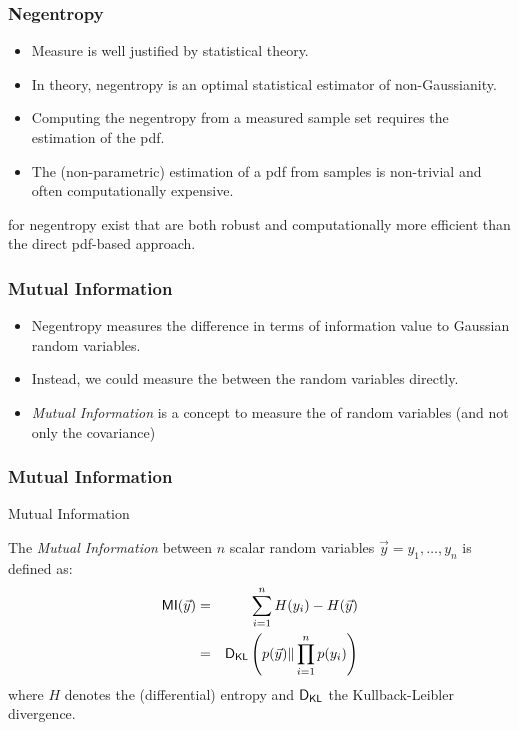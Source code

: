 \begin{frame}
  \frametitle{Negentropy \cont}
  

  \begin{itemize}
    \item Measure is well justified by statistical theory. \pause
    \item In theory, negentropy is an optimal statistical estimator of non-Gaussianity. \pause
    \item Computing the negentropy from a measured sample set requires the estimation of the pdf. \pause
    \item The (non-parametric) estimation of a pdf from samples is non-trivial and often computationally expensive.
  \end{itemize}
  \pspread

   for negentropy exist that are both robust and computationally more efficient than the direct pdf-based approach.
\end{frame}


\begin{frame}
  \frametitle{Mutual Information}


  \begin{itemize}
    \item Negentropy measures the difference in terms of information value to Gaussian random variables. \pause
    \item Instead, we could measure the  between the random variables directly. \pause
    \item \textit{Mutual Information} is a concept to measure the  of random variables (and not only the covariance)
  \end{itemize}
\end{frame}


\begin{frame}
  \frametitle{Mutual Information}
  
  \begin{citeblock}{Mutual Information}
  
  The \textit{Mutual Information} between $n$ scalar random variables $\vec y = y_1, \ldots, y_n$ is defined as:
    \begin{eqnarray*}
      \mathop{\mathsf{MI}}(\vec y) &=& \sum_{i = 1}^n H(y_i) - H(\vec y) \\
                  &=& \mathop{\mathsf{D}_{\mathsf{KL}}} \left( p(\vec y) \| \prod_{i=1}^n p(y_i) \right)
    \end{eqnarray*}
    where $H$ denotes the (differential) entropy and $\mathop{\mathsf{D}_{\mathsf{KL}}}$ the Kullback-Leibler divergence.
  \end{citeblock}
\end{frame}


